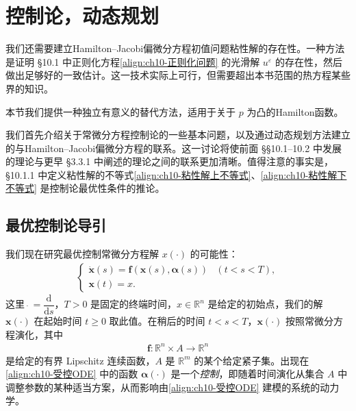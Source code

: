 \documentclass[../../main.tex]{subfiles}
\begin{document}
\section{控制论，动态规划}\label{section:ch10-控制论动态规划}

我们还需要建立Hamilton--Jacobi偏微分方程初值问题粘性解的存在性。一种方法是证明 \S10.1 中正则化方程\eqref{align:ch10-正则化问题} 的光滑解 $u^\varepsilon$ 的存在性，然后做出足够好的一致估计。这一技术实际上可行，但需要超出本书范围的热方程某些界的知识。

本节我们提供一种独立有意义的替代方法，适用于关于 $p$ 为凸的Hamilton函数。

我们首先介绍关于常微分方程控制论的一些基本问题，以及通过动态规划方法建立的与Hamilton--Jacobi偏微分方程的联系。这一讨论将使前面 \S\S10.1--10.2 中发展的理论与更早 \S3.3.1 中阐述的理论之间的联系更加清晰。值得注意的事实是，\S10.1.1 中定义粘性解的不等式\eqref{align:ch10-粘性解上不等式}、\eqref{align:ch10-粘性解下不等式} 是控制论最优性条件的推论。

\subsection{最优控制论导引}\label{subsection:ch10-最优控制导引}

我们现在研究最优控制常微分方程解 $x(\cdot)$ 的可能性：
\begin{align}
\begin{cases}
\dot{\mathbf{x}}(s)=\mathbf{f}(\mathbf{x}(s),\boldsymbol{\alpha}(s)) & (t<s<T),\\
\mathbf{x}(t)=x.
\end{cases}
\label{align:ch10-受控ODE}
\end{align}
这里 $\dot{\;}=\dfrac{\mathrm{d}}{\mathrm{d}s}$，$T>0$ 是固定的终端时间，$x\in\mathbb{R}^n$ 是给定的初始点，我们的解 $\mathbf{x}(\cdot)$ 在起始时间 $t\geqslant 0$ 取此值。在稍后的时间 $t<s<T$，$\mathbf{x}(\cdot)$ 按照常微分方程演化，其中
\begin{align*}
\mathbf{f}:\mathbb{R}^n\times A\to\mathbb{R}^n
\end{align*}
是给定的有界 Lipschitz 连续函数，$A$ 是 $\mathbb{R}^m$ 的某个给定紧子集。出现在\eqref{align:ch10-受控ODE} 中的函数 $\boldsymbol{\alpha}(\cdot)$ 是一个\emph{控制}，即随着时间演化从集合 $A$ 中调整参数的某种适当方案，从而影响由\eqref{align:ch10-受控ODE} 建模的系统的动力学。
\end{document}
